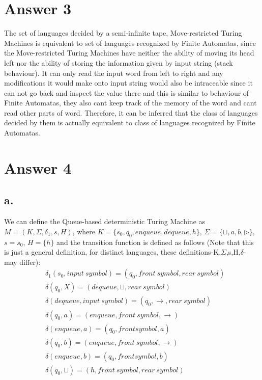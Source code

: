 \documentclass[12pt]{article}
\begin{document}
\section*{Answer 3}
The set of languages decided by a semi-infinite tape, Move-restricted Turing Machines is equivalent to set of languages recognized by Finite Automatas, since the Move-restricted Turing Machines have neither the ability of moving its head left nor the ability of storing the information given by input string (stack behaviour). It can only read the input word from left to right and any modifications it would make onto input string would also be intraceable since it can not go back and inspect the value there and this is similar to behaviour of Finite Automatas, they also cant keep track of the memory of the word and cant read other parts of word. Therefore, it can be inferred that the class of languages decided by them is actually equivalent to class of languages recognized by Finite Automatas.

\section*{Answer 4}

\subsection*{a.}
We can define the Queue-based deterministic Turing Machine as $M = (K,\Sigma,\delta_1, s, H)$, where
$K = \{s_0,q_0,enqueue,dequeue,h\}$, $\Sigma = \{\sqcup,a,b,\triangleright\}$, $s = s_0$, $H = \{h\}
$ and the transition function is defined as follows (Note that this is just a general definition, for distinct languages, these definitions-K,$\Sigma$,s,H,$\delta$- may differ):
\begin{align*}
&\delta_1(s_0,input \ symbol) = (q_0,front \ symbol,rear \ symbol)\\
&\delta(q_0,X) = (dequeue,\sqcup,rear \ symbol) \\
&\delta(dequeue,input \ symbol) = (q_0,\rightarrow,rear \ symbol) \\
&\delta(q_0,a) = (enqueue,front \ symbol,\rightarrow) \\
&\delta(enqueue,a) = (q_0,front symbol,a) \\
&\delta(q_0,b) = (enqueue,front \ symbol,\rightarrow) \\
&\delta(enqueue,b) = (q_0,front symbol,b) \\
&\delta(q_0,\sqcup) = (h,front \ symbol,rear \ symbol)
\end{align*}
\end{document}
